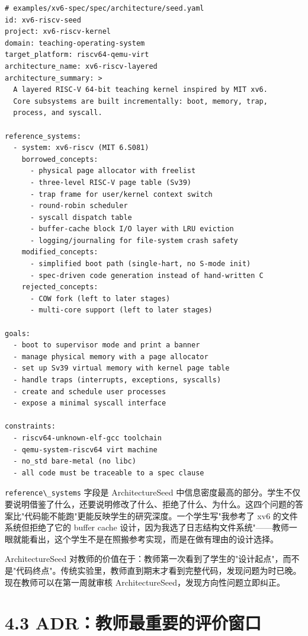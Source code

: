 \documentclass[UTF8,a4paper,12pt,openany]{ctexrep}
\newcommand{\passthrough}[1]{#1}
\begin{document}
\begin{lstlisting}
# examples/xv6-spec/spec/architecture/seed.yaml
id: xv6-riscv-seed
project: xv6-riscv-kernel
domain: teaching-operating-system
target_platform: riscv64-qemu-virt
architecture_name: xv6-riscv-layered
architecture_summary: >
  A layered RISC-V 64-bit teaching kernel inspired by MIT xv6.
  Core subsystems are built incrementally: boot, memory, trap,
  process, and syscall.

reference_systems:
  - system: xv6-riscv (MIT 6.S081)
    borrowed_concepts:
      - physical page allocator with freelist
      - three-level RISC-V page table (Sv39)
      - trap frame for user/kernel context switch
      - round-robin scheduler
      - syscall dispatch table
      - buffer-cache block I/O layer with LRU eviction
      - logging/journaling for file-system crash safety
    modified_concepts:
      - simplified boot path (single-hart, no S-mode init)
      - spec-driven code generation instead of hand-written C
    rejected_concepts:
      - COW fork (left to later stages)
      - multi-core support (left to later stages)

goals:
  - boot to supervisor mode and print a banner
  - manage physical memory with a page allocator
  - set up Sv39 virtual memory with kernel page table
  - handle traps (interrupts, exceptions, syscalls)
  - create and schedule user processes
  - expose a minimal syscall interface

constraints:
  - riscv64-unknown-elf-gcc toolchain
  - qemu-system-riscv64 virt machine
  - no_std bare-metal (no libc)
  - all code must be traceable to a spec clause
\end{lstlisting}

\passthrough{\lstinline!reference\_systems!} 字段是 ArchitectureSeed 中信息密度最高的部分。学生不仅要说明借鉴了什么，还要说明修改了什么、拒绝了什么、为什么。这四个问题的答案比"代码能不能跑"更能反映学生的研究深度。一个学生写"我参考了 xv6 的文件系统但拒绝了它的 buffer cache 设计，因为我选了日志结构文件系统"------教师一眼就能看出，这个学生不是在照搬参考实现，而是在做有理由的设计选择。

ArchitectureSeed 对教师的价值在于：教师第一次看到了学生的"设计起点"，而不是"代码终点"。传统实验里，教师直到期末才看到完整代码，发现问题为时已晚。现在教师可以在第一周就审核 ArchitectureSeed，发现方向性问题立即纠正。

\section{4.3 ADR：教师最重要的评价窗口}\label{43-adrux6559ux5e08ux6700ux91cdux8981ux7684ux8bc4ux4ef7ux7a97ux53e3}
\end{document}
